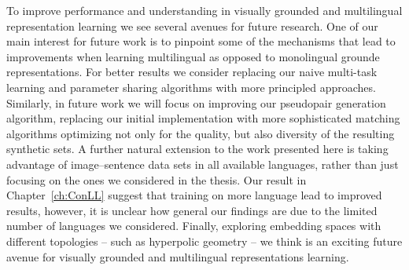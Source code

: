 To improve performance and understanding in visually grounded and multilingual 
representation learning we see several avenues for future research. 
One of our main interest for future work is to pinpoint some of the mechanisms that lead to 
improvements when learning multilingual as opposed to monolingual grounde representations. 
For better results we consider replacing our naive multi-task learning and parameter sharing algorithms with 
more principled approaches. Similarly, in future work we will focus on improving our pseudopair generation 
algorithm, replacing our initial implementation with more sophisticated matching algorithms optimizing not
only for the quality, but also diversity of the resulting synthetic sets.
A further natural extension to the work presented here is taking advantage 
of image--sentence data sets in all available languages, rather than just focusing on the ones we considered 
in the thesis. Our result in Chapter~\ref{ch:ConLL} suggest that training on more language lead to improved results,
however, it is unclear how general our findings are due to the limited number of languages we considered.
Finally, exploring embedding spaces with different topologies -- such as hyperpolic geometry -- we think is an exciting
future avenue for visually grounded and multilingual representations learning.
















